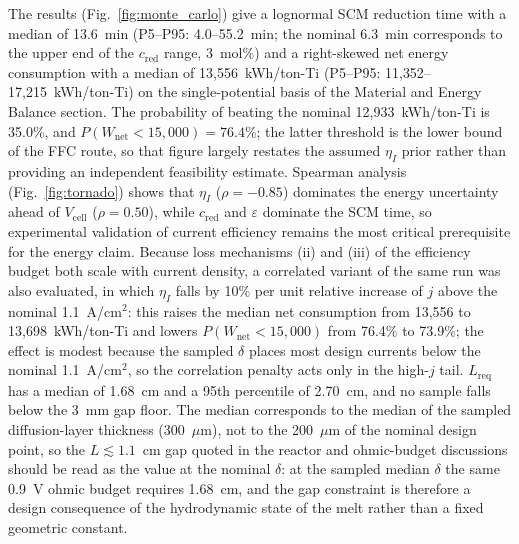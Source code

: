 \documentclass[pdflatex,sn-basic,Numbered]{sn-jnl}
\begin{document}
The results (Fig.~\ref{fig:monte_carlo}) give a lognormal SCM reduction time with a median of 13.6~min (P5--P95: 4.0--55.2~min; the nominal 6.3~min corresponds to the upper end of the $c_{\mathrm{red}}$ range, 3~mol\%) and a right-skewed net energy consumption with a median of 13{,}556~kWh/ton-Ti (P5--P95: 11{,}352--17{,}215~kWh/ton-Ti) on the single-potential basis of the Material and Energy Balance section. The probability of beating the nominal 12{,}933~kWh/ton-Ti is 35.0\%, and $P(W_{\mathrm{net}} < 15{,}000) = 76.4\%$; the latter threshold is the lower bound of the FFC route, so that figure largely restates the assumed $\eta_I$ prior rather than providing an independent feasibility estimate. Spearman analysis (Fig.~\ref{fig:tornado}) shows that $\eta_I$ ($\rho = -0.85$) dominates the energy uncertainty ahead of $V_{\mathrm{cell}}$ ($\rho = 0.50$), while $c_{\mathrm{red}}$ and $\varepsilon$ dominate the SCM time, so experimental validation of current efficiency remains the most critical prerequisite for the energy claim. Because loss mechanisms (ii) and (iii) of the efficiency budget both scale with current density, a correlated variant of the same run was also evaluated, in which $\eta_I$ falls by 10\% per unit relative increase of $j$ above the nominal 1.1~A/cm$^2$: this raises the median net consumption from 13{,}556 to 13{,}698~kWh/ton-Ti and lowers $P(W_{\mathrm{net}} < 15{,}000)$ from 76.4\% to 73.9\%; the effect is modest because the sampled $\delta$ places most design currents below the nominal 1.1~A/cm$^2$, so the correlation penalty acts only in the high-$j$ tail. $L_{\mathrm{req}}$ has a median of 1.68~cm and a 95th percentile of 2.70~cm, and no sample falls below the 3~mm gap floor. The median corresponds to the median of the sampled diffusion-layer thickness (300~$\mu$m), not to the 200~$\mu$m of the nominal design point, so the $L \lesssim 1.1$~cm gap quoted in the reactor and ohmic-budget discussions should be read as the value at the nominal $\delta$: at the sampled median $\delta$ the same 0.9~V ohmic budget requires 1.68~cm, and the gap constraint is therefore a design consequence of the hydrodynamic state of the melt rather than a fixed geometric constant.
\end{document}
